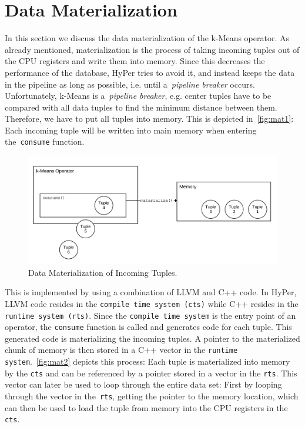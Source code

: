 \section{Data Materialization}

In this section we discuss the data materialization of the k-Means operator. As already mentioned, materialization is the process of taking incoming tuples out of the CPU registers and write them into memory. Since this decreases the performance of the database, HyPer tries to avoid it, and instead keeps the data in the pipeline as long as possible, i.e. until a~\emph{pipeline breaker} occurs. Unfortunately, k-Means is a~\emph{pipeline breaker}, e.g. center tuples have to be compared with all data tuples to find the minimum distance between them. Therefore, we have to put all tuples into memory. This is depicted in~\autoref{fig:mat1}: Each incoming tuple will be written into main memory when entering the~\texttt{consume} function. 

\begin{figure}[htsb]
  \centerline{
      \includegraphics[scale=0.05]{figures/mat1_font2}
  }
  \caption[Data Materialization of Incoming Tuples]{Data Materialization of Incoming Tuples.}
  \label{fig:mat1}
\end{figure}

This is implemented by using a combination of LLVM and C++ code. In HyPer, LLVM code resides in the \texttt{compile time system (cts)} while C++ resides in the \texttt{runtime system (rts)}. Since the \texttt{compile time system} is the entry point of an operator, the \texttt{consume} function is called and generates code for each tuple. This generated code is materializing the incoming tuples. A pointer to the materialized chunk of memory is then stored in a C++ vector in the \texttt{runtime system}.~\autoref{fig:mat2} depicts this process: Each tuple is materialized into memory by the \texttt{cts} and can be referenced by a pointer stored in a vector in the \texttt{rts}. This vector can later be used to loop through the entire data set: First by looping through the vector in the~\texttt{rts}, getting the pointer to the memory location, which can then be used to load the tuple from memory into the CPU registers in the \texttt{cts}. 


